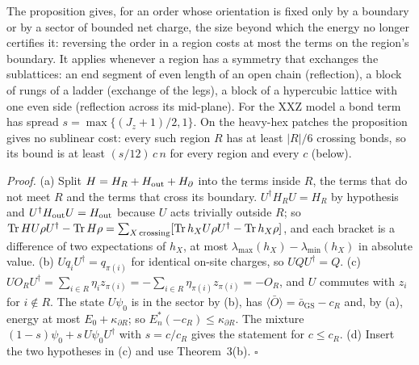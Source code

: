 \documentclass[aps,prx,onecolumn,10pt,nofootinbib,longbibliography,floatfix]{revtex4-2}
\theoremstyle{remark}
\newcommand{\Jz}{J_z}
\newcommand{\Tr}{\operatorname{Tr}}
\newcommand{\GS}{\mathrm{GS}}
\begin{document}
The proposition gives, for an order whose orientation is fixed only by a boundary or by a sector of bounded
net charge, the size beyond which the energy no longer certifies it: reversing the order in a region costs at
most the terms on the region's boundary. It applies whenever a region has a symmetry that exchanges the
sublattices: an end segment of even length of an open chain (reflection), a block of rungs of a ladder
(exchange of the legs), a block of a hypercubic lattice with one even side (reflection across its mid-plane).
For the XXZ model a bond term has spread $s=\max\{(\Jz+1)/2,1\}$. On the heavy-hex patches the proposition gives
no sublinear cost: every such region $R$ has at least $|R|/6$ crossing bonds, so its bound is at least
$(s/12)\,c\,n$ for every region and every $c$ (below). %

\emph{Proof.} (a) Split $H=H_R+H_{\rm out}+H_\partial$ into the terms inside $R$, the terms that do not meet $R$
and the terms that cross its boundary. $U^\dagger H_RU=H_R$ by hypothesis and $U^\dagger H_{\rm out}U=H_{\rm out}$
because $U$ acts trivially outside $R$; so
$\Tr HU\rho U^\dagger-\Tr H\rho=\sum_{X\,{\rm crossing}}[\Tr h_XU\rho U^\dagger-\Tr h_X\rho]$, and each bracket is a
difference of two expectations of $h_X$, at most $\lambda_{\max}(h_X)-\lambda_{\min}(h_X)$ in absolute value.
(b) $Uq_iU^\dagger=q_{\pi(i)}$ for identical on-site charges, so $UQU^\dagger=Q$.
(c) $UO_RU^\dagger=\sum_{i\in R}\eta_iz_{\pi(i)}=-\sum_{i\in R}\eta_{\pi(i)}z_{\pi(i)}=-O_R$, and $U$ commutes with
$z_i$ for $i\notin R$. The state $U\psi_0$ is in the sector by (b), has
$\langle\bar O\rangle=\bar o_\GS-c_R$ and, by (a), energy at most $E_0+\kappa_{\partial R}$; so
$E^*_n(-c_R)\le\kappa_{\partial R}$. The mixture $(1-s)\psi_0+s\,U\psi_0U^\dagger$ with $s=c/c_R$ gives the
statement for $c\le c_R$.
(d) Insert the two hypotheses in (c) and use Theorem~3(b). \hfill$\square$ %
\end{document}
